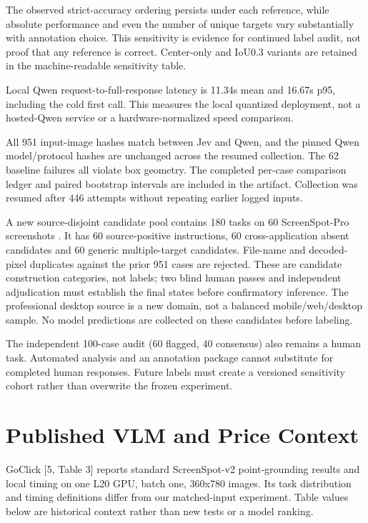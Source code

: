\documentclass[10pt]{article}
\begin{document}
The observed strict-accuracy ordering persists under each reference, while absolute performance and even the number of unique targets vary substantially with annotation choice. This sensitivity is evidence for continued label audit, not proof that any reference is correct. Center-only and IoU0.3 variants are retained in the machine-readable sensitivity table.

Local Qwen request-to-full-response latency is 11.34s mean and 16.67s p95, including the cold first call. This measures the local quantized deployment, not a hosted-Qwen service or a hardware-normalized speed comparison.

All 951 input-image hashes match between Jev and Qwen, and the pinned Qwen model/protocol hashes are unchanged across the resumed collection. The 62 baseline failures all violate box geometry. The completed per-case comparison ledger and paired bootstrap intervals are included in the artifact. Collection was resumed after 446 attempts without repeating earlier logged inputs.

A new source-disjoint candidate pool contains 180 tasks on 60 ScreenSpot-Pro screenshots \cite{ref14}. It has 60 source-positive instructions, 60 cross-application absent candidates and 60 generic multiple-target candidates. File-name and decoded-pixel duplicates against the prior 951 cases are rejected. These are candidate construction categories, not labels; two blind human passes and independent adjudication must establish the final states before confirmatory inference. The professional desktop source is a new domain, not a balanced mobile/web/desktop sample. No model predictions are collected on these candidates before labeling.

The independent 100-case audit (60 flagged, 40 consensus) also remains a human task. Automated analysis and an annotation package cannot substitute for completed human responses. Future labels must create a versioned sensitivity cohort rather than overwrite the frozen experiment.

\section{Published VLM and Price Context}
GoClick [5, Table 3] reports standard ScreenSpot-v2 point-grounding results and local timing on one L20 GPU, batch one, 360x780 images. Its task distribution and timing definitions differ from our matched-input experiment. Table values below are historical context rather than new tests or a model ranking.
\end{document}
